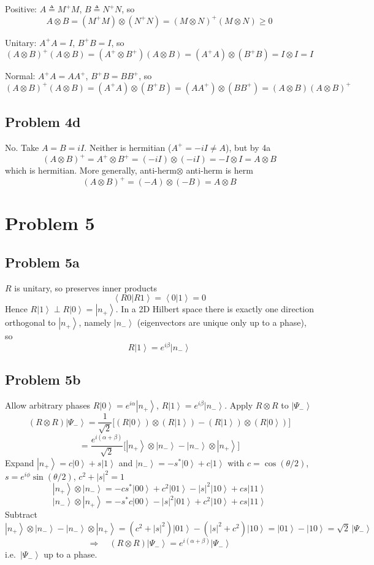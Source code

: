 \documentclass[
]{article}
\providecommand{\ket}[1]{\left\lvert #1 \right\rangle}
\providecommand{\braket}[1]{\left\langle #1 \right\rangle}
\providecommand{\Rarr}{\Rightarrow}
\begin{document}
Positive: $A\triangleq M^+ M$, $B\triangleq N^+ N$, so
\[
	A\otimes B=(M^+ M)\otimes(N^+ N)=(M\otimes N)^+(M\otimes N)\geq 0
\]

Unitary: $A^+ A=I$, $B^+ B=I$, so
\[
	(A\otimes B)^+(A\otimes B)=(A^+\otimes B^+)(A\otimes B)=(A^+ A)\otimes(B^+ B)=I\otimes I=I
\]

Normal: $A^+ A=AA^+$, $B^+ B=BB^+$, so
\[
	(A\otimes B)^+(A\otimes B)=(A^+ A)\otimes(B^+ B)=(AA^+)\otimes(BB^+)=(A\otimes B)(A\otimes B)^+
\]

\subsection*{Problem 4d}
No. Take $A=B=iI$. Neither is hermitian ($A^+=-iI\neq A$), but by 4a
\[
	(A\otimes B)^+=A^+\otimes B^+=(-iI)\otimes(-iI)=-I\otimes I=A\otimes B
\]
which is hermitian. More generally, anti-herm$\otimes$ anti-herm is herm
\[
	(A\otimes B)^+=(-A)\otimes(-B)=A\otimes B
\]

\section*{Problem 5}

\subsection*{Problem 5a}
$R$ is unitary, so preserves inner products
\[
	\braket{R0|R1}=\braket{0|1}=0
\]
Hence $R\ket{1}\perp R\ket{0}=\ket{n_+}$. In a 2D Hilbert space there is exactly one direction orthogonal to $\ket{n_+}$, namely $\ket{n_-}$ (eigenvectors are unique only up to a phase), so
\[
	R\ket{1}=e^{i\beta}\ket{n_-}
\]

\subsection*{Problem 5b}
Allow arbitrary phases $R\ket{0}=e^{i\alpha}\ket{n_+}$, $R\ket{1}=e^{i\beta}\ket{n_-}$. Apply $R\otimes R$ to $\ket{\Psi_-}$
\[
	(R\otimes R)\ket{\Psi_-}=\frac{1}{\sqrt{2}}\big[(R\ket{0})\otimes(R\ket{1})-(R\ket{1})\otimes(R\ket{0})\big]
\]
\[
	=\frac{e^{i(\alpha+\beta)}}{\sqrt{2}}\big[\ket{n_+}\otimes\ket{n_-}-\ket{n_-}\otimes\ket{n_+}\big]
\]
Expand $\ket{n_+}=c\ket{0}+s\ket{1}$ and $\ket{n_-}=-s^*\ket{0}+c\ket{1}$ with $c=\cos(\theta/2)$, $s=e^{i\phi}\sin(\theta/2)$, $c^2+|s|^2=1$
\[
	\ket{n_+}\otimes\ket{n_-}=-cs^*\ket{00}+c^2\ket{01}-|s|^2\ket{10}+cs\ket{11}
\]
\[
	\ket{n_-}\otimes\ket{n_+}=-s^*c\ket{00}-|s|^2\ket{01}+c^2\ket{10}+cs\ket{11}
\]
Subtract
\[
	\ket{n_+}\otimes\ket{n_-}-\ket{n_-}\otimes\ket{n_+}=(c^2+|s|^2)\ket{01}-(|s|^2+c^2)\ket{10}=\ket{01}-\ket{10}=\sqrt{2}\,\ket{\Psi_-}
\]
\[
	\Rarr\quad (R\otimes R)\ket{\Psi_-}=e^{i(\alpha+\beta)}\ket{\Psi_-}
\]
i.e.~$\ket{\Psi_-}$ up to a phase.
\end{document}
